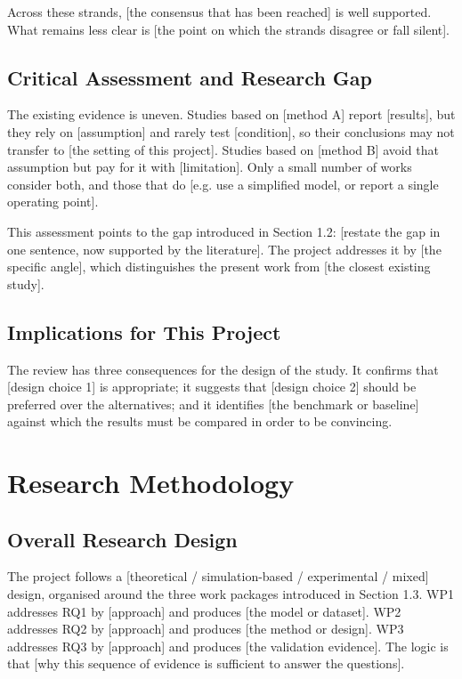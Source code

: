 \documentclass{article}
\begin{document}
Across these strands, [the consensus that has been reached] is well supported. What remains
less clear is [the point on which the strands disagree or fall silent].

\subsection{Critical Assessment and Research Gap}
The existing evidence is uneven. Studies based on [method A] report [results], but they rely on
[assumption] and rarely test [condition], so their conclusions may not transfer to [the setting
of this project]. Studies based on [method B] avoid that assumption but pay for it with
[limitation]. Only a small number of works consider both, and those that do
[e.g. use a simplified model, or report a single operating point].

This assessment points to the gap introduced in Section 1.2: [restate the gap in one sentence,
now supported by the literature]. The project addresses it by [the specific angle], which
distinguishes the present work from [the closest existing study].

\subsection{Implications for This Project}
The review has three consequences for the design of the study. It confirms that [design choice
1] is appropriate; it suggests that [design choice 2] should be preferred over the alternatives;
and it identifies [the benchmark or baseline] against which the results must be compared in
order to be convincing.

\section{Research Methodology}

\subsection{Overall Research Design}
The project follows a [theoretical / simulation-based / experimental / mixed] design, organised
around the three work packages introduced in Section 1.3. WP1 addresses RQ1 by [approach] and
produces [the model or dataset]. WP2 addresses RQ2 by [approach] and produces [the method or
design]. WP3 addresses RQ3 by [approach] and produces [the validation evidence]. The logic is
that [why this sequence of evidence is sufficient to answer the questions].
\end{document}
